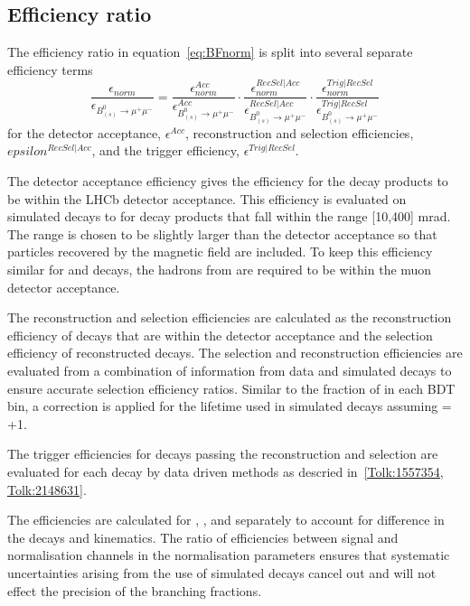 {{\subsection{Efficiency ratio}
The efficiency ratio in equation~\ref{eq:BFnorm} is split into several separate efficiency terms 
\begin{equation}
\frac{\epsilon_{norm}}{\epsilon_{B^{0}_{(s)} \to \mu^{+} \mu^{-}}}  =  \frac{\epsilon^{Acc}_{norm}}{\epsilon^{Acc}_{B^{0}_{(s)} \to \mu^{+} \mu^{-}}} \cdot \frac{\epsilon^{RecSel|Acc}_{norm}}{\epsilon^{RecSel|Acc}_{B^{0}_{(s)} \to \mu^{+} \mu^{-}}} \cdot \frac{\epsilon^{Trig|RecSel}_{norm}}{\epsilon^{Trig|RecSel}_{B^{0}_{(s)} \to \mu^{+} \mu^{-}}}
\label{eq:BFnormDetailed}
\end{equation}
for the detector acceptance, $\epsilon^{Acc}$, reconstruction and selection efficiencies, $epsilon^{RecSel|Acc}$, and the trigger efficiency, $\epsilon^{Trig|RecSel}$. 

The detector acceptance efficiency gives the efficiency for the decay products to be within the LHCb detector acceptance. This efficiency is evaluated on simulated decays to for decay products that fall within the range [10,400] mrad. The range is chosen to be slightly larger than the detector acceptance so that particles recovered by the magnetic field are included. To keep this efficiency similar for \bmumu and \bdkpi decays, the hadrons from \bdkpi are required to be within the muon detector acceptance. 

The reconstruction and selection efficiencies are calculated as the reconstruction efficiency of decays that are within the detector acceptance and the selection efficiency of reconstructed decays. The selection and reconstruction efficiencies are evaluated from a combination of information from data and simulated decays to ensure accurate selection efficiency ratios. Similar to the fraction of \bsmumu in each BDT bin, a correction is applied for the lifetime used in simulated \bsmumu decays assuming \ADG = +1. 

The trigger efficiencies for decays passing the reconstruction and selection are evaluated for each decay by data driven methods as descried in~\ref{Tolk:1557354, Tolk:2148631}. 

The efficiencies are calculated for \bsmumu, \bdmumu, \bdkpi and \bujpsik separately to account for difference in the decays and kinematics. The ratio of efficiencies between signal and normalisation channels in the normalisation parameters ensures that systematic uncertainties arising from the use of simulated decays cancel out and will not effect the precision of the \bmumu branching fractions.

}}
